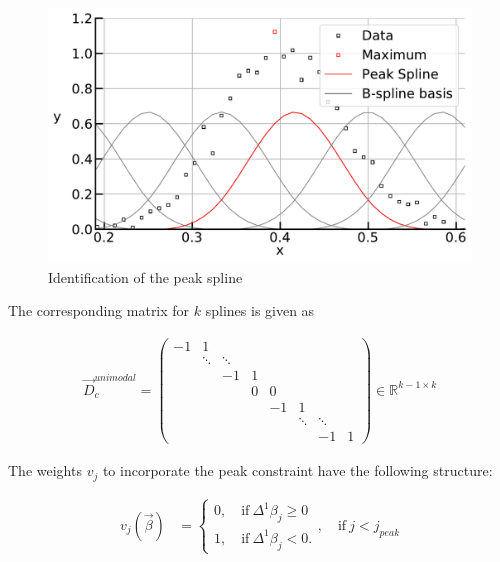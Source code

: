 \documentclass[10pt,a4paper]{article}
\begin{document}
	\begin{figure}[H]
		\centering
		\includegraphics[width=\linewidth]{../thesisplots/peak_spline.pdf}
		\caption{Identification of the peak spline}
		\label{fig:peak_spline}
	\end{figure}
	
	
	The corresponding matrix for $k$ splines is given as 
	
	\begin{align}\label{eq:D_c_unimodal}
		\vec{D}_c^{unimodal} = \begin{pmatrix} -1 & 1 \\ 
									    				 & \ddots & \ddots  \\
									                     &        &     -1 & 1 & \\
									    			     & 		  & 	   & 0 & 0 & \\ 
													     &		  &		   &   &-1 & 1 \\
													     &		  &		   &   &   &\ddots & \ddots \\
													     & 	      &        &   &   &       &  -1    & 1
					 \end{pmatrix} \in \mathbb{R}^{k-1 \times k}
	\end{align}
	
	The weights $v_j$ to incorporate the peak constraint have the following structure:
	
	\begin{align}\label{eq:v_peak_1}
		v_j(\vec{\beta}) &= \begin{cases} 
										0, \quad \text{if} \ \Delta^1\beta_j \ge 0 \\ 
										1, \quad \text{if} \ \Delta^1\beta_j  < 0.
								  \end{cases}, \quad \text{if} \ j < j_{peak}
	\end{align}
	
\end{document}
